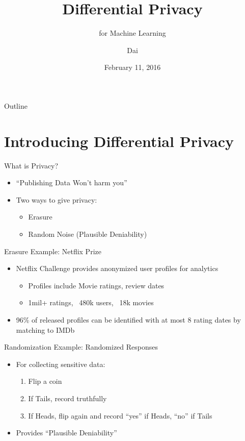 \documentclass{beamer}
\title{Differential Privacy}
\subtitle{for Machine Learning}
\author{Dai}
\date{February 11, 2016}
\begin{document}
\begin{frame}
  \titlepage
\end{frame}

\begin{frame}{Outline}
  \tableofcontents
\end{frame}


\section{Introducing Differential Privacy}
\begin{frame}{What is Privacy?}
  \begin{itemize}
    \item ``Publishing Data Won't harm you''
    \item Two ways to give privacy: \begin{itemize}
      \item Erasure
      \item Random Noise (Plausible Deniability)
    \end{itemize}
  \end{itemize}
\end{frame}

\begin{frame}{Erasure Example: Netflix Prize}
\begin{itemize}
  \item Netflix Challenge provides anonymized user profiles for analytics
  \begin{itemize}
    \item Profiles include Movie ratings, review dates
    \item 1mil+ ratings, ~480k users, ~18k movies
  \end{itemize}
  \item 96\% of released profiles can be identified with at most 8 rating dates by matching to IMDb
\end{itemize}
\end{frame}

\begin{frame}{Randomization Example: Randomized Responses}
  \begin{itemize}
    \item For collecting sensitive data: \begin{enumerate}
      \item Flip a coin
      \item If Tails, record truthfully
      \item If Heads, flip again and record ``yes'' if Heads, ``no'' if Tails
    \end{enumerate}
    \item Provides ``Plausible Deniability''
  \end{itemize}
\end{frame}
\end{document}
